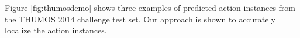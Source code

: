 \documentclass[10pt,twocolumn,letterpaper]{article}
\begin{document}


Figure \ref{fig:thumosdemo} shows three examples of predicted action instances from the THUMOS 2014 challenge test set. Our approach is shown to accurately localize the action instances. 
\end{document}
